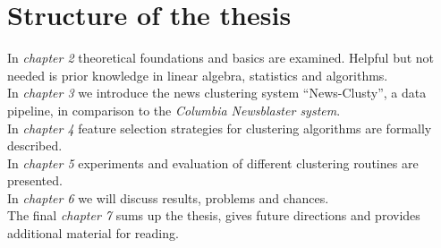 \section{Structure of the thesis}
  In \emph{chapter 2} theoretical foundations and basics are examined. Helpful but not needed is prior knowledge in linear algebra, statistics and algorithms.\\
  In \emph{chapter 3} we introduce the news clustering system ``News-Clusty'', a data pipeline, in comparison to the \emph{Columbia Newsblaster system}.\\
  In \emph{chapter 4} feature selection strategies for clustering algorithms are formally described.\\
  In \emph{chapter 5} experiments and evaluation of different clustering routines are presented.\\
  In \emph{chapter 6} we will discuss results, problems and chances.\\
  The final \emph{chapter 7} sums up the thesis, gives future directions and provides additional material for reading.

